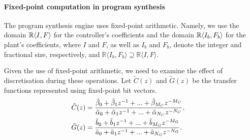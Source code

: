 \documentclass{sig-alternate-05-2015}
\newcommand{\red}[1]{{\color{red}#1}}
\begin{document}

\paragraph{Fixed-point computation in program synthesis}

The program synthesis engine uses fixed-point arithmetic.  Namely, we use
the domain $\mathbb{R}\langle{I},{F}\rangle$ for the controller's coefficients and
the domain $\mathbb{R}\langle{I_b},{F_b}\rangle$ for the plant's coefficients, 
where $I$ and $F$, as well as $I_b$ and $F_b$, denote the integer and
fractional size, respectively, and $\mathbb{R}\langle I_b,F_b \rangle
\supseteq \mathbb{R}\langle I,F \rangle$.
%

Given the use of fixed-point arithmetic, 
we need to examine the effect of discretisation during these operations.
Let $\tilde C(z)$ and $\tilde G(z)$ be the transfer functions represented
using fixed-point bit vectors.%
%
\begin{align}
\small
\label{digital_controller_plant_tf}
\tilde C(z)&=\frac{\tilde \beta_{0}+\tilde \beta_{1}z^{-1}+...+\tilde \beta_{M_C}z^{-M_C}}{\tilde \alpha_{0}+\tilde \alpha_{1}z^{-1}+...+\tilde \alpha_{N_C}z^{-N_C}}, \\
\tilde G(z)&=\frac{\tilde b_{0}+\tilde b_{1}z^{-1}+...+\tilde b_{M_G}z^{-M_G}}{\tilde a_{0}+\tilde a_{1}z^{-1}+...+\tilde a_{N_G}z^{-N_G}}.
\end{align}
 
\end{document}
